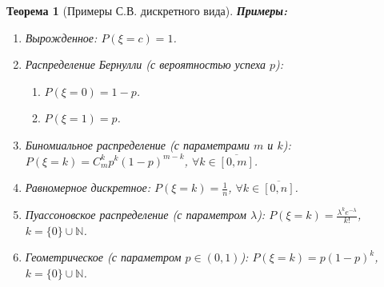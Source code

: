 \documentclass[14pt]{extarticle}
\theoremstyle{breakstyle}
\newtheorem{theorem}{Теорема}[subsection]
\begin{document}
\begin{theorem}[Примеры С.В. дискретного вида]

\textbf{Примеры:}
\begin{enumerate}
    \item Вырожденное: $P(\xi = c) = 1$.

    \item Распределение Бернулли (с вероятностью успеха $p$):
          \begin{enumerate}
              \item $P(\xi = 0) = 1 - p$.
              \item $P(\xi = 1) = p$.
          \end{enumerate}

    \item Биномиальное распределение (с параметрами $m$ и $k$): $P(\xi = k) = C_{m}^{k}p^{k}(1-p)^{m - k}$, $\forall k \in \overline{[0, m]}$.
    \item Равномерное дискретное: $P(\xi = k) = \frac{1}{n}$, $\forall k \in \overline{[0, n]}$.
    \item Пуассоновское распределение (с параметром $\lambda$): $P(\xi = k) = \frac{\lambda^{k}e^{-\lambda}}{k!}$, $k = \{0\} \cup \mathbb{N}$.
    \item Геометрическое (с параметром $p \in (0, 1)$): $P(\xi = k) = p (1-p)^{k}$, $k = \{0\} \cup \mathbb{N}$.
          
\end{enumerate}

\end{theorem}
\end{document}
